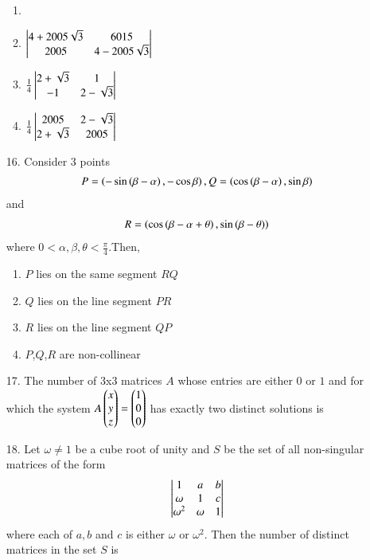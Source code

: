 \documentclass[journal,12pt,onecolumn]{IEEEtran}
\theoremstyle{remark}
\begin{document}
\begin{enumerate}
			\begin{enumerate}
				\item {}
			\item $\begin{vmatrix} 4 + 2005\sqrt{3} & 6015 \\ 2005 & 4 - 2005\sqrt{3}\end{vmatrix}$
			\item $\frac{1}{4}\begin{vmatrix}2 + \sqrt{3} & 1 \\ -1 & 2 -\sqrt{3}\end{vmatrix}$
			\item $\frac{1}{4}\begin{vmatrix}2005 & 2 - \sqrt{3} \\ 2 + \sqrt{3} & 2005\end{vmatrix}$
			\end{enumerate}		
		\item[16.] Consider 3 points 
			\begin{align*}
				P=\left(-\sin \left(\beta - \alpha\right), - \cos\beta\right), Q = \left(\cos \left(\beta - \alpha\right), \sin\beta\right)
				\end{align*} and 
				\begin{align*} R = \left(\cos \left(\beta - \alpha + \theta\right), \sin\left(\beta - \theta\right)\right) \end{align*} where $0<\alpha,\beta,\theta<\frac{\pi}{4}.$Then, \hfill{}
			\begin{enumerate}
				\item $P$ lies on the same segment $RQ$
				\item $Q$ lies on the line segment $PR$
				\item $R$ lies on the line segment $QP$
				\item $P$,$Q$,$R$ are non-collinear
			\end{enumerate}
	\item[17.] The number of 3x3 matrices $A$ whose entries are either $0$ or $1$ and for which the system $A\begin{pmatrix}x\\y\\z\end{pmatrix}=\begin{pmatrix}1\\0\\0\end{pmatrix}$ has exactly two distinct solutions is \hfill{}

		\begin{enumerate}
		\end{enumerate}
	\item[18.] Let $\omega \neq 1$ be a cube root of unity and $S$ be the set of all non-singular matrices of the form 
		\begin{align*}
			\begin{vmatrix}
				1 & a & b \\
				\omega & 1 & c\\
				\omega^2 & \omega & 1
			\end{vmatrix}
		\end{align*} where each of $a,b$ and $c$ is either $\omega$ or $\omega^2$. Then the number of distinct matrices in the set $S$ is
		\hfill{}
			

\end{enumerate}
\end{document}
